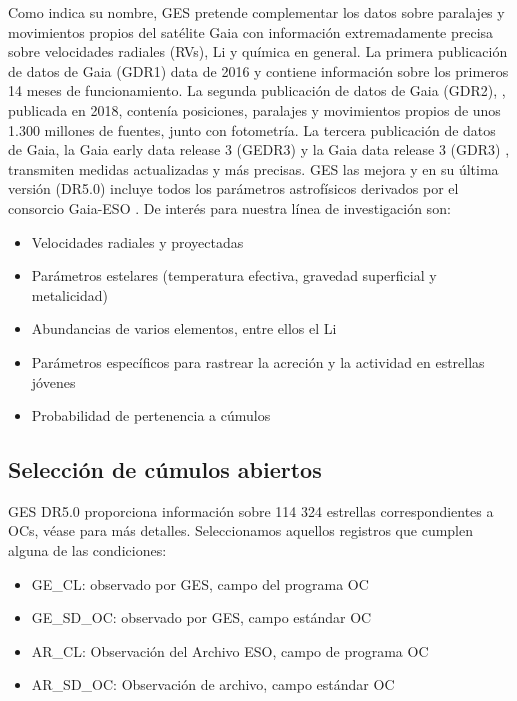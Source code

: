 Como indica su nombre, GES pretende complementar los datos sobre paralajes y movimientos propios del satélite Gaia \cite{Mignard2005} con información extremadamente precisa sobre velocidades radiales (RVs), Li y química en general. La primera publicación de datos de Gaia (GDR1) \cite{Brown2016} data de 2016 y contiene información sobre los primeros 14 meses de funcionamiento. La segunda publicación de datos de Gaia (GDR2), \cite{Brown2018}, publicada en 2018, contenía posiciones, paralajes y movimientos propios de unos 1.300 millones de fuentes, junto con fotometría. La tercera publicación de datos de Gaia, la Gaia early data release 3 (GEDR3) \cite{Brown2021} y la Gaia data release 3 (GDR3) \cite{Brown2022}, transmiten medidas actualizadas y más precisas. GES las mejora y en su última versión (DR5.0) incluye todos los parámetros astrofísicos derivados por el consorcio Gaia-ESO \cite{Gilmore2022}. De interés para nuestra línea de investigación son:
\begin{itemize}
	\item Velocidades radiales y proyectadas
	\item Parámetros estelares (temperatura efectiva, gravedad superficial y metalicidad)
	\item Abundancias de varios elementos, entre ellos el Li
	\item Parámetros específicos para rastrear la acreción y la actividad en estrellas jóvenes
	\item Probabilidad de pertenencia a cúmulos
\end{itemize}


\subsection{Selección de cúmulos abiertos}
GES DR5.0 proporciona información sobre 114 324 estrellas correspondientes a OCs, véase \cite{Gilmore2022} para más detalles. Seleccionamos aquellos registros que cumplen alguna de las condiciones:

\begin{itemize}
	\item GE\_CL: observado por GES, campo del programa OC
	\item GE\_SD\_OC: observado por GES, campo estándar OC
	\item AR\_CL: Observación del Archivo ESO, campo de programa OC
	\item AR\_SD\_OC: Observación de archivo, campo estándar OC
\end{itemize}
	
